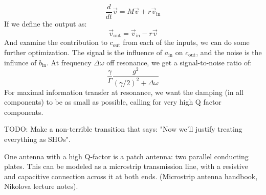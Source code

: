 \documentclass[final]{article}
\begin{document}
\[\frac{d}{dt} \vec v=M\vec v+r\vec v_{\text{in}}\]
If we define the output as:
\[\vec v_{\text{out}}=\vec v_{\text{in}}-r \vec v\]
And examine the contribution to \(c_{\text{out}}\) from each of the inputs, we can do some further optimization. The signal is the influence of \(a_{\text{in}}\) on \(c_{\text{out}}\), and the noise is the influnce of \(b_{\text{in}}\). At frequency \(\Delta \omega\) off resonance, we get a signal-to-noise ratio of:
\[\frac{\gamma}{\Gamma}\frac{g^2}{(\gamma/2)^2+\Delta \omega}\]
For maximal information transfer at resonance, we want the damping (in all components) to be as small as possible, calling for very high Q factor components.

TODO: Make a non-terrible transition that says: "Now we'll justify treating everything as SHOs".

One antenna with a high Q-factor is a patch antenna: two parallel conducting plates. This can be modeled as a microstrip transmission line, with a resistive and capacitive connection across it at both ends. (Microstrip antenna handbook, Nikolova lecture notes).
\end{document}
